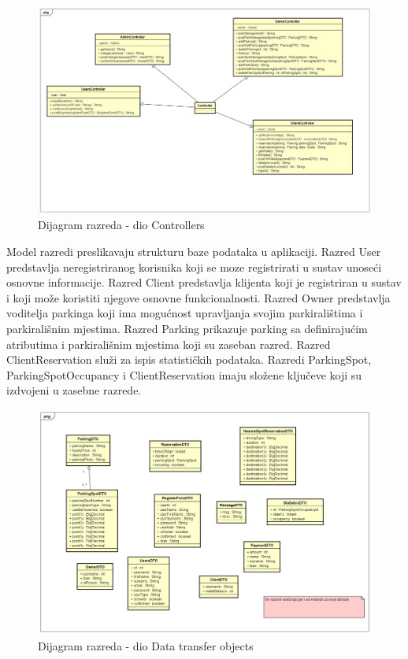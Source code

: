 \begin{figure}[H]
	
	\includegraphics[width=\textwidth]{slike/controller.png} %
	\centering
	\caption{Dijagram razreda - dio Controllers}
	\label{fig:controllers}
\end{figure}

Model razredi preslikavaju strukturu baze podataka u aplikaciji. Razred User predstavlja neregistriranog korisnika koji se moze registrirati u sustav unoseći osnovne informacije. Razred Client predstavlja klijenta koji je registriran u sustav i koji može koristiti njegove osnovne funkcionalnosti. Razred Owner predstavlja voditelja parkinga koji ima mogućnost upravljanja svojim parkiralištima i parkirališnim mjestima. Razred Parking prikazuje parking sa definirajućim atributima i parkirališnim mjestima koji su zaseban razred. Razred ClientReservation služi za ispis statističkih podataka. Razredi ParkingSpot, ParkingSpotOccupancy i ClientReservation imaju složene ključeve koji su izdvojeni u zasebne razrede.

\begin{figure}[H]
	
	\includegraphics[width=\textwidth]{slike/dto.png} %
	\centering
	\caption{Dijagram razreda - dio Data transfer objects}
	\label{fig:dto}
\end{figure}



